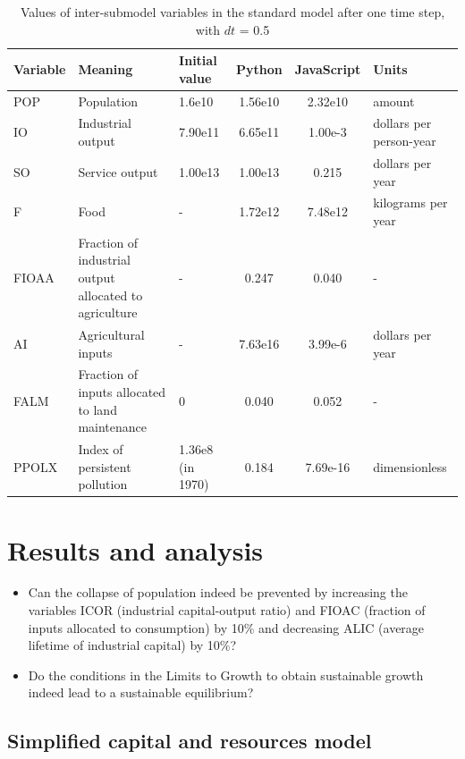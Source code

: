 \documentclass[10pt,a4paper]{scrartcl}
\begin{document}
\begin{table}
\centering
\begin{longtable}{|m{1.3cm}|m{3cm}|m{1.2cm}|c|c|m{2cm}|}
\hline
\textbf{Variable} & \textbf{Meaning} & \textbf{Initial value} & \textbf{Python} & \textbf{JavaScript} & \textbf{Units}\\
\hline
POP & Population & 1.6e10 & 1.56e10 & 2.32e10 & amount\\
\hline
IO & Industrial output & 7.90e11 & 6.65e11 & 1.00e-3 & dollars per person-year\\
\hline
SO & Service output & 1.00e13 & 1.00e13 & 0.215 & dollars per year\\
\hline
F & Food & - & 1.72e12 & 7.48e12 & kilograms per year\\
\hline
FIOAA & Fraction of industrial output allocated to agriculture & - & 0.247 & 0.040 & -\\
\hline
AI & Agricultural inputs & - & 7.63e16 & 3.99e-6 & dollars per year\\
\hline
FALM & Fraction of inputs allocated to land maintenance & 0 & 0.040 & 0.052 & -\\
\hline
PPOLX & Index of persistent pollution & 1.36e8 (in 1970) & 0.184 & 7.69e-16 & dimensionless\\
\hline
\end{longtable}
\caption{Values of inter-submodel variables in the standard model after one time step, with $dt$ = 0.5}
\label{value-differences}
\end{table}

\section*{Results and analysis}

\begin{itemize}
	\item Can the collapse of population indeed be prevented by increasing the variables ICOR (industrial capital-output ratio) and FIOAC (fraction of inputs allocated to consumption) by 10\% and decreasing ALIC (average lifetime of industrial capital) by 10\%?
	\item Do the conditions in the Limits to Growth to obtain sustainable growth indeed lead to a sustainable equilibrium?
\end{itemize}

\subsection*{Simplified capital and resources model}
\end{document}
